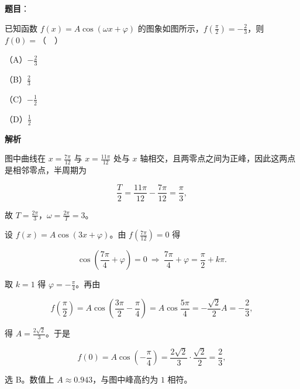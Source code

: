 \begin{answer}

\textbf{题目}：

已知函数 $f(x)=A\cos(\omega x+\varphi)$ 的图象如图所示，$f\left(\frac{\pi}{2}\right)=-\frac23$，则 $f(0)=$（　）

（A）$-\frac23$

（B）$\frac23$

（C）$-\frac12$

（D）$\frac12$
\nopagebreak[4]
\begin{center}\end{center}
\nopagebreak[4]
\textbf{解析}

图中曲线在 $x=\frac{7\pi}{12}$ 与 $x=\frac{11\pi}{12}$ 处与 $x$ 轴相交，且两零点之间为正峰，因此这两点是相邻零点，半周期为

\nopagebreak[4]
\[\frac{T}{2}=\frac{11\pi}{12}-\frac{7\pi}{12}=\frac{\pi}{3},\]

故 $T=\frac{2\pi}{3}$，$\omega=\frac{2\pi}{T}=3$。

设 $f(x)=A\cos(3x+\varphi)$。由 $f\left(\frac{7\pi}{12}\right)=0$ 得

\nopagebreak[4]
\[\cos\left(\frac{7\pi}{4}+\varphi\right)=0
\ \Longrightarrow\ \frac{7\pi}{4}+\varphi=\frac{\pi}{2}+k\pi .\]

取 $k=1$ 得 $\varphi=-\frac{\pi}{4}$。再由

\nopagebreak[4]
\[f\left(\frac{\pi}{2}\right)
=A\cos\left(\frac{3\pi}{2}-\frac{\pi}{4}\right)
=A\cos\frac{5\pi}{4}
=-\frac{\sqrt2}{2}A
=-\frac23,\]

得 $A=\frac{2\sqrt2}{3}$。于是

\nopagebreak[4]
\[f(0)=A\cos\left(-\frac{\pi}{4}\right)
=\frac{2\sqrt2}{3}\cdot\frac{\sqrt2}{2}
=\frac23,\]

选 B。数值上 $A\approx0.943$，与图中峰高约为 $1$ 相符。


\end{answer}
